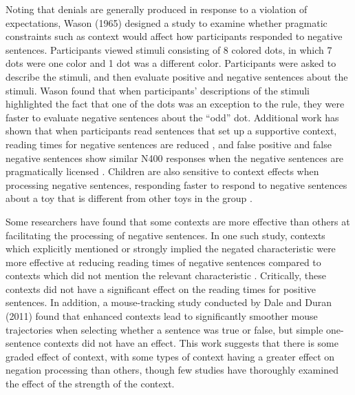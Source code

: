 \documentclass[10pt,letterpaper]{article}
\begin{document}
Noting that denials are generally produced in response to a violation of expectations, Wason (1965) designed a study to examine whether pragmatic constraints such as context would affect how participants responded to negative sentences.  Participants viewed stimuli consisting of 8 colored dots, in which 7 dots were one color and 1 dot was a different color.  Participants were asked to describe the stimuli, and then evaluate positive and negative sentences about the stimuli.  Wason found that when participants' descriptions of the stimuli highlighted the fact that one of the dots was an exception to the rule, they were faster to evaluate negative sentences about the ``odd'' dot.  Additional work has shown that when participants read sentences that set up a supportive context, reading times for negative sentences are reduced \cite{glenberg1999}, and false positive and false negative sentences show similar N400 responses when the negative sentences are pragmatically licensed \cite{nieuwland2008}.  Children are also sensitive to context effects when processing negative sentences, responding faster to respond to negative sentences about a toy that is different from other toys in the group \cite{devilliers1975}.

Some researchers have found that some contexts are more effective than others at facilitating the processing of negative sentences.  In one such study, contexts which explicitly mentioned or strongly implied the negated characteristic were more effective at reducing reading times of negative sentences compared to contexts which did not mention the relevant characteristic \cite{ludtke2006}.  Critically, these contexts did not have a significant effect on the reading times for positive sentences.  In addition, a mouse-tracking study conducted by Dale and Duran (2011) \nocite{dale2011} found that enhanced contexts lead to significantly smoother mouse trajectories when selecting whether a sentence was true or false, but simple one-sentence contexts did not have an effect.  This work suggests that there is some graded effect of context, with some types of context having a greater effect on negation processing than others, though few studies have thoroughly examined the effect of the strength of the context.
\end{document}
